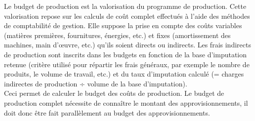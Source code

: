 \documentclass{kaobook}
\begin{document}
Le budget de production est la valorisation du programme de production. Cette valorisation repose sur les calculs de coût complet effectués à l'aide des méthodes de comptabilité de gestion. Elle suppose la prise en compte des coûts variables (matières premières, fournitures, énergies, etc.) et fixes (amortissement des machines, main d'œuvre, etc.) qu'ils soient directs ou indirects. Les frais indirects de production sont inscrits dans les budgets en fonction de la base d'imputation retenue (critère utilisé pour répartir les frais généraux, par exemple le nombre de produits, le volume de travail, etc.) et du taux d'imputation calculé (= charges indirectes de production ÷ volume de la base d'imputation).\\
Ceci permet de calculer le budget des coûts de production. Le budget de production complet nécessite de connaître le montant des approvisionnements, il doit donc être fait parallèlement au budget des approvisionnements.\\
\end{document}
